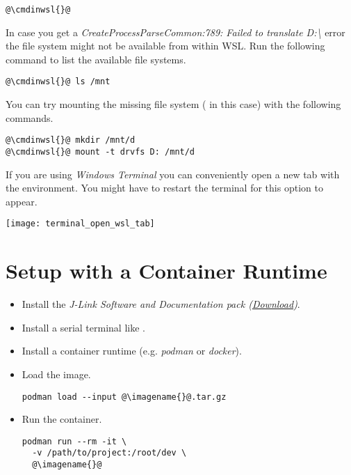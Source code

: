 \begin{itemize}
        \begin{lstlisting}
@\cmdinwsl{}@
\end{lstlisting}

        \begin{infobox}
          In case you get a \emph{CreateProcessParseCommon:789: Failed to
          translate D:\textbackslash} error the file system might not be
          available from within WSL. Run the following command to list the
          available file systems.

          \begin{lstlisting}
@\cmdinwsl{}@ ls /mnt
\end{lstlisting}

          You can try mounting the missing file system
          ( in this case) with the following
          commands.

          \begin{lstlisting}
@\cmdinwsl{}@ mkdir /mnt/d
@\cmdinwsl{}@ mount -t drvfs D: /mnt/d
\end{lstlisting}
        \end{infobox}
        \begin{infobox}
          If you are using \emph{Windows Terminal} you can conveniently open a
          new tab with the environment. You might have to restart the terminal
          for this option to appear.
          \begin{center}
            \texttt{[image: terminal\_open\_wsl\_tab]}
          \end{center}
        \end{infobox}
\end{itemize}

\newpage

\section{Setup with a Container Runtime}

\begin{itemize}
  \item Install the \emph{J-Link Software and Documentation pack
        (\href{https://www.segger.com/downloads/jlink}{Download})}.
  \item Install a serial terminal like .
  \item Install a container runtime (e.g. \emph{podman} or \emph{docker}).
  \item Load the image.
        \begin{lstlisting}
podman load --input @\imagename{}@.tar.gz
\end{lstlisting}
  \item Run the container.
        \begin{lstlisting}
podman run --rm -it \
  -v /path/to/project:/root/dev \
  @\imagename{}@
\end{lstlisting}
\end{itemize}

